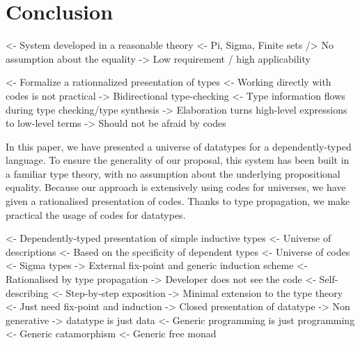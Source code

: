 \documentclass[preprint
              , authoryear
              ]{sigplanconf}
\newenvironment{wstructure}{\comment}{\endcomment}
\begin{document}









\section{Conclusion}

\begin{wstructure}
<- System developed in a reasonable theory
    <- Pi, Sigma, Finite sets
    /> No assumption about the equality
    -> Low requirement / high applicability
\end{wstructure}

\begin{wstructure}
<- Formalize a rationnalized presentation of types
    <- Working directly with codes is not practical
    -> Bidirectional type-checking
        <- Type information flows during type checking/type synthesis
        -> Elaboration turns high-level expressions to low-level terms
    -> Should not be afraid by codes
\end{wstructure}

In this paper, we have presented a universe of datatypes for a
dependently-typed language. To ensure the generality of our proposal,
this system has been built in a familiar type theory, with no
assumption about the underlying propositional equality. Because our
approach is extensively using codes for universes, we have given a
rationalised presentation of codes. Thanks to type propagation, we
make practical the usage of codes for datatypes.

\begin{wstructure}
<- Dependently-typed presentation of simple inductive types
    <- Universe of descriptions
        <- Based on the specificity of dependent types
            <- Universe of codes
            <- Sigma types
        -> External fix-point and generic induction scheme
    <- Rationalised by type propagation
        -> Developer does not see the code
    <- Self-describing
        <- Step-by-step exposition
        -> Minimal extension to the type theory
            <- Just need fix-point and induction
        -> Closed presentation of datatype
            -> Non generative
        -> datatype is just data
    <- Generic programming is just programming
        <- Generic catamorphism
        <- Generic free monad
\end{wstructure}
\end{document}
